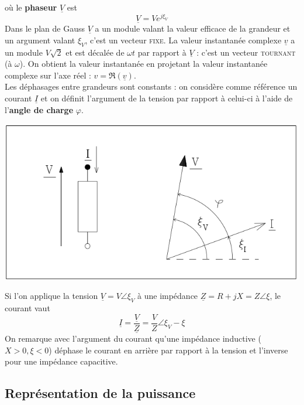 où le \textbf{phaseur} $\underline{V}$ est 
\begin{equation}
	\underline{V} = Ve^{j\xi_V}
\end{equation}
Dans le plan de Gauss $\underline{V}$ a un module valant la valeur efficace 
de la grandeur et un argument valant $\xi_V$, c'est un vecteur \textsc{fixe}.
La valeur instantanée complexe $\underline{v}$ a un module $V\sqrt{2}$ et est 
décalée de $\omega t$ par rapport à $\underline{V}$ : c'est un vecteur 
\textsc{tournant} (à $\omega$). On obtient la valeur instantanée en projetant 
la valeur instantanée complexe sur l'axe réel : $v = \Re(\underline{v})$.\\
	
Les déphasages entre grandeurs sont constants : on considère comme référence un 
courant $\underline{I}$ et on définit l'argument de la tension par rapport à 
celui-ci à l'aide de l'\textbf{angle de charge} $\varphi$.
	
\begin{center}
	\includegraphics[scale=0.4]{ch1/image3.png}
\end{center}	
		
Si l'on applique la tension $\underline{V} = V\angle \xi_V$ à une impédance 
$\underline{Z} = R + jX = Z\angle \xi$, le courant vaut 
\begin{equation}
	\underline{I} = \frac{\underline{V}}{\underline{Z}} = \frac{V}{Z}\angle 
	\xi_V-\xi
\end{equation}
On remarque avec l'argument du courant qu'une impédance inductive ($X>0, 
\xi <0$) déphase le courant en arrière par rapport à la tension et l'inverse 
pour une impédance capacitive.
	
	
\subsection{Représentation de la puissance}
